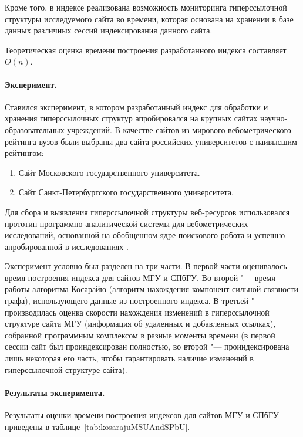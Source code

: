Кроме того, в индексе реализована возможность мониторинга гиперссылочной структуры исследуемого сайта во времени, которая основана на хранении в базе данных различных сессий индексирования данного сайта.

Теоретическая оценка времени построения разработанного индекса составляет \(O(n)\).

\paragraph{Эксперимент.} Ставился эксперимент, в котором разработанный индекс для обработки и хранения гиперссылочных структур апробировался на крупных сайтах научно-образовательных учреждений. В качестве сайтов из мирового вебометрического рейтинга вузов \cite{RankingWeb} были выбраны два сайта российских университетов с наивысшим рейтингом:

\begin{enumerate}
	\item Сайт Московского государственного университета.
	\item Сайт Санкт-Петербургского государственного университета.
\end{enumerate}

Для сбора и выявления гиперссылочной структуры веб-ресурсов использовался прототип программно-аналитической системы для вебометрических исследований, основанной на обобщенном ядре поискового робота и успешно апробированной в исследованиях \cite{MaksimovBlekanov,BlekanovSergeevMaksimovBOWTIE}.

Эксперимент условно был разделен на три части. В первой части оценивалось время построения индекса для сайтов МГУ и СПбГУ. Во второй "--- время работы алгоритма Косарайю (алгоритм нахождения компонент сильной связности графа), использующего данные из построенного индекса. В третьей "--- производилась оценка скорости нахождения изменений в гиперссылочной структуре сайта МГУ (информация об удаленных и добавленных ссылках), собранной программным комплексом в разные моменты времени (в первой сессии сайт был проиндексирован полностью, во второй "--- проиндексирована лишь некоторая его часть, чтобы гарантировать наличие изменений в гиперссылочной структуре сайта).

\paragraph{Результаты эксперимента.} Результаты оценки времени построения индексов для сайтов МГУ и СПбГУ приведены в таблице~\cref{tab:kosarajuMSUAndSPbU}.

